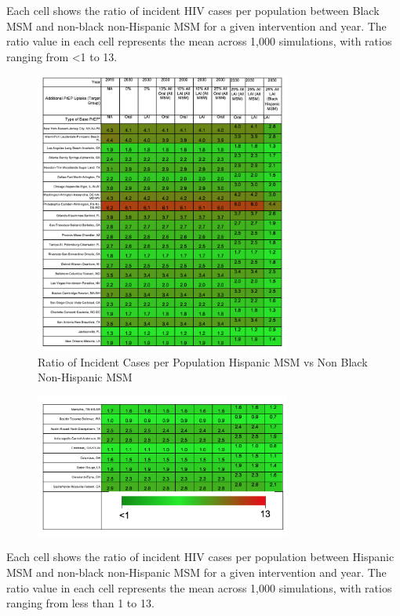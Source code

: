 \documentclass{article}
\begin{document}
Each cell shows the ratio of incident HIV cases per population between Black MSM and non-black non-Hispanic MSM for a given intervention and year. The ratio value in each cell represents the mean across 1,000 simulations, with ratios ranging from <1 to 13. 

\begin{figure}[H]
	\centering
	\caption{Ratio of Incident Cases per Population Hispanic MSM vs Non Black Non-Hispanic MSM}
	\includegraphics[width=0.75\textwidth]{images/FigureS7_1}
\end{figure}

\pagebreak

\begin{figure}[H]
	\centering
	\includegraphics[width=0.75\textwidth]{images/FigureS7_2}
\end{figure}

Each cell shows the ratio of incident HIV cases per population between Hispanic MSM and non-black non-Hispanic MSM for a given intervention and year. The ratio value in each cell represents the mean across 1,000 simulations, with ratios ranging from less than 1 to 13. 
\end{document}
